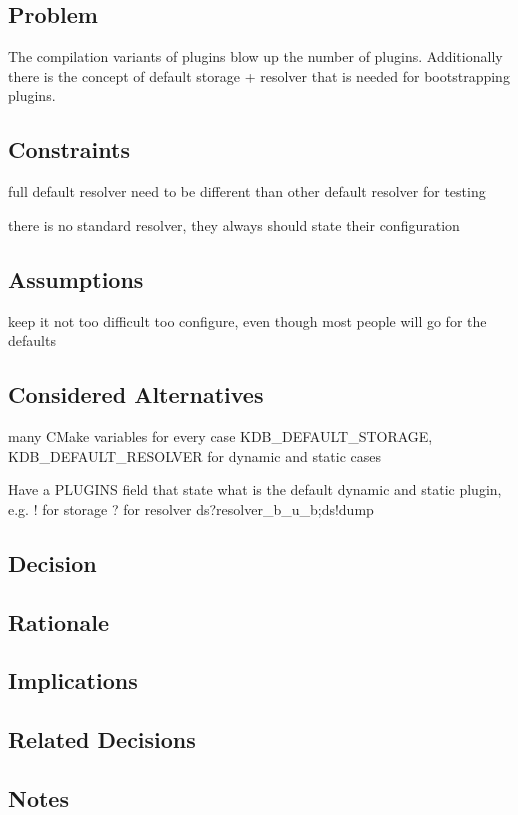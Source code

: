 \subsection*{Problem}

The compilation variants of plugins blow up the number of plugins. Additionally there is the concept of default storage + resolver that is needed for bootstrapping plugins.

\subsection*{Constraints}


\begin{DoxyItemize}
\item full default resolver need to be different than other default resolver for testing
\item there is no standard resolver, they always should state their configuration
\end{DoxyItemize}

\subsection*{Assumptions}


\begin{DoxyItemize}
\item keep it not too difficult too configure, even though most people will go for the defaults
\end{DoxyItemize}

\subsection*{Considered Alternatives}


\begin{DoxyItemize}
\item many C\+Make variables for every case K\+D\+B\+\_\+\+D\+E\+F\+A\+U\+L\+T\+\_\+\+S\+T\+O\+R\+A\+GE, K\+D\+B\+\_\+\+D\+E\+F\+A\+U\+L\+T\+\_\+\+R\+E\+S\+O\+L\+V\+ER for dynamic and static cases
\item Have a P\+L\+U\+G\+I\+NS field that state what is the default dynamic and static plugin, e.\+g. ! for storage ? for resolver ds?resolver\+\_\+b\+\_\+u\+\_\+b;ds!dump
\end{DoxyItemize}

\subsection*{Decision}

\subsection*{Rationale}

\subsection*{Implications}

\subsection*{Related Decisions}

\subsection*{Notes}